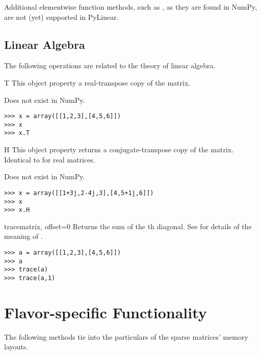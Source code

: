 Additional elementwise function methods, such as , as they are
found in NumPy, are not (yet) supported in PyLinear.
\subsection{Linear Algebra}
The following operations are related to the theory of linear algebra.

\begin{memberdesc}[Matrix]{T}
  This object property a real-transpose copy of the matrix.

  Does not exist in NumPy.
\begin{verbatim}
>>> x = array([[1,2,3],[4,5,6]])
>>> x
>>> x.T
\end{verbatim}
\end{memberdesc}

\begin{memberdesc}[Matrix]{H}
  This object property returns a conjugate-transpose copy of the matrix.
  Identical to  for real matrices.

  Does not exist in NumPy.
\begin{verbatim}
>>> x = array([[1+3j,2-4j,3],[4,5+1j,6]])
>>> x
>>> x.H
\end{verbatim}
\end{memberdesc}

\begin{funcdesc}{trace}{matrix, offset=0}
  Returns the sum of the th diagonal. See 
  for details of the meaning of .
\begin{verbatim}
>>> a = array([[1,2,3],[4,5,6]])
>>> a
>>> trace(a)
>>> trace(a,1)
\end{verbatim}
\end{funcdesc}
\section{Flavor-specific Functionality}

The following methods tie into the particulars of the sparse matrices'
memory layouts.

